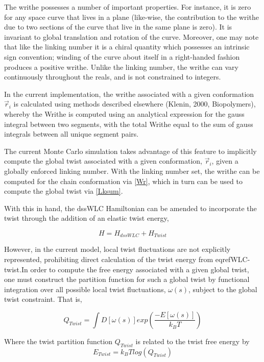 \documentclass[english]{article}
\begin{document}
The writhe possesses a number of important properties. For instance, it is zero for any space curve that lives in a plane (like-wise, the contribution to the writhe due to two sections of the curve that live in the same plane is zero). It is invariant to global translation and rotation of the curve. Moreover, one may note that like the linking number it is a chiral quantity which possesses an intrinsic sign convention; winding of the curve about itself in a right-handed fashion produces a positive writhe. Unlike the linking number, the writhe can vary continuously throughout the reals, and is not constrained to integers.

In the current implementation, the writhe associated with a given conformation ${\vec{r}_i}$ is calculated using methods described elsewhere (Klenin, 2000, Biopolymers), whereby the Writhe is computed using an analytical expression for the gauss integral between two segments, with the total Writhe equal to the sum of gauss integrals between all unique segment pairs.

The current Monte Carlo simulation takes advantage of this feature to implicitly compute the global twist associated with a given conformation, ${\vec{r}_i}$, given a globally enforced linking number. With the linking number set, the writhe can be computed for the chain conformation via \eqref{Wr}, which in turn can be used to compute the global twist via \eqref{Lksum}. 

With this in hand, the dssWLC Hamiltonian can be amended to incorporate the twist through the addition of an elastic twist energy,

\begin{equation}
H=H_{dssWLC}+H_{Twist}
\end{equation}

However, in the current model, local twist fluctuations are not explicitly represented, prohibiting direct calculation of the twist energy from eqref{WLC-twist}.In order to compute the free energy associated with a given global twist, one must construct the partition function for such a global twist by functional integration over all possible local twist fluctuations, $\omega(s)$, subject to the global twist constraint. That is,

\begin{equation}
Q_{Twist}=\int D[\omega(s)]exp(\frac{-E[\omega(s)]}{k_BT})
\end{equation}

Where the twist partition function $Q_{Twist}$ is related to the twist free energy by
\begin{equation}
E_{Twist}=k_BTlog(Q_{Twist})
\end{equation}
\end{document}
